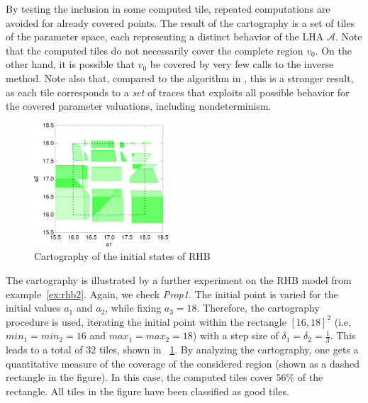 \documentclass{llncs}
\newcommand{\A}{\ensuremath{\mathcal{A}}}
\begin{document}
By testing the inclusion in some computed tile, repeated computations
are avoided for already covered points. The result of the cartography
is a set of tiles of the parameter space, each representing a
distinct behavior of the LHA \A. Note that the computed tiles do not
necessarily cover the complete region $v_0$. On the other hand, it is
possible that $v_0$ be covered by very few calls to the inverse
method.
Note also that, compared to the algorithm in \cite{AKRS:2008}, this is a
stronger result, as each tile corresponds to a \emph{set} of traces
that exploits all possible behavior for the covered parameter
valuations, including nondeterminism. 

\begin{example}\label{ex:carto}
  \begin{figure}[tb]
    \centering
    \includegraphics[width=5cm]{images/rhb_cart2.pdf}
    \caption{Cartography of the initial states of RHB}\label{fig:cart_rhb}
  \end{figure}

  The cartography is illustrated by a further experiment on the RHB
  model from example~\ref{ex:rhb2}. Again, we check \textit{Prop1}. The initial point is varied for
  the initial values $a_1$ and $a_2$, while fixing $a_3 =
  18$. Therefore, the cartography procedure is used, iterating the
  initial point within the rectangle $[16,18]^2$ (i.e,
  $min_1=min_2=16$ and $max_1=max_2=18$) with a step size of
  $\delta_1=\delta_2=\frac{1}{3}$. This leads to a total of $32$
  tiles, shown in \figurename~\ref{fig:cart_rhb}. By analyzing the
  cartography, one gets a quantitative measure of the
  coverage of the considered region (shown as a dashed
  rectangle in the figure). In this case, the computed tiles cover $56
  \%$ of the rectangle. All tiles in the figure have been classified
  as good tiles.
\end{example}
\end{document}
